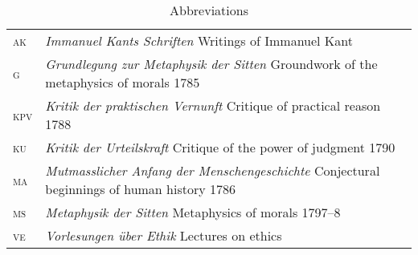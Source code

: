 \documentclass[a4paper,12pt]{article}
\begin{document}
\begin{table}
	[ht] \setlength{\abovecaptionskip}{0pt} \setlength{\belowcaptionskip}{10pt} \caption{Abbreviations} 
	\begin{tabular*}
		{\textwidth}{lp{}}
	    \textsc{ak} & \emph{Immanuel Kants Schriften} Writings of Immanuel Kant\\
		\textsc{g} & \emph{Grundlegung zur Metaphysik der Sitten} Groundwork of the metaphysics of morals 1785\\
		\textsc{kpv} & \emph{Kritik der praktischen Vernunft} Critique of practical reason 1788\\
		\textsc{ku} & \emph{Kritik der Urteilskraft} Critique of the power of judgment 1790\\
		\textsc{ma} & \emph{Mutmasslicher Anfang der Menschengeschichte} Conjectural beginnings of human history 1786\\
		\textsc{ms} & \emph{Metaphysik der Sitten} Metaphysics of morals 1797--8\\
		\textsc{ve} & \emph{Vorlesungen \"uber Ethik} Lectures on ethics \\
	\end{tabular*}
\end{table}

\end{document}
